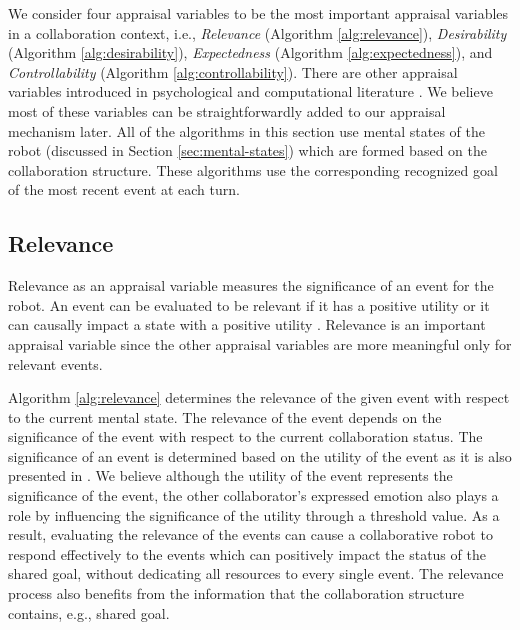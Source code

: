\documentclass{article}
\begin{document}
We consider four appraisal variables to be the most important appraisal
variables in a collaboration context, i.e., \textit{Relevance} (Algorithm
\ref{alg:relevance}), \textit{Desirability} (Algorithm \ref{alg:desirability}),
\textit{Expectedness} (Algorithm \ref{alg:expectedness}), and
\textit{Controllability} (Algorithm \ref{alg:controllability}). There are other
appraisal variables introduced in psychological
\cite{scherer:appraisal-processes} and computational literature
\cite{gratch:domain-independent}. We believe most of these variables can be
straightforwardly added to our appraisal mechanism later. All of the algorithms
in this section use mental states of the robot (discussed in Section
\ref{sec:mental-states}) which are formed based on the collaboration structure.
These algorithms use the corresponding recognized goal of the most recent event
at each turn.

\subsection{Relevance}

Relevance as an appraisal variable measures the significance of an event for the
robot. An event can be evaluated to be relevant if it has a positive utility or
it can causally impact a state with a positive utility
\cite{marsella:ema-process-model}. Relevance is an important appraisal variable
since the other appraisal variables are more meaningful only for relevant
events.

Algorithm \ref{alg:relevance} determines the relevance of the given event with
respect to the current mental state. The relevance of the event depends on the
significance of the event with respect to the current collaboration status.
The significance of an event is determined based on the utility of the event as
it is also presented in
\cite{gratch:domain-independent,marsella:ema-process-model}. We believe although
the utility of the event represents the significance of the event, the other
collaborator's expressed emotion also plays a role by influencing the
significance of the utility through a threshold value. As a result, evaluating
the relevance of the events can cause a collaborative robot to respond
effectively to the events which can positively impact the status of the shared
goal, without dedicating all resources to every single event. The relevance
process also benefits from the information that the collaboration structure
contains, e.g., shared goal.
\end{document}
